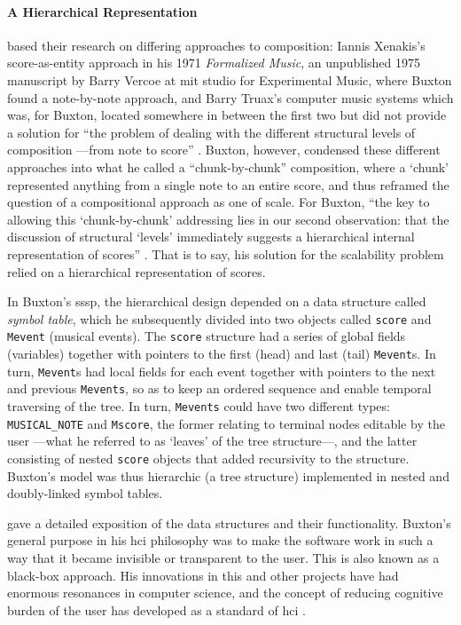 \paragraph{A Hierarchical Representation}
\textcite{DBLP:conf/icmc/BuxtonFBRSCM78} based their research on differing approaches to composition: Iannis Xenakis's score-as-entity approach in his 1971 \textit{Formalized Music}, an unpublished 1975 manuscript by Barry Vercoe at \gls{mit} studio for Experimental Music, where Buxton found a note-by-note approach, and Barry Truax's computer music systems \parencite{Tru73:The} which was, for Buxton, located somewhere in between the first two but did not provide a solution for ``the problem of dealing with the different structural levels of composition ---from note to score'' \parencite[120]{icmc/bbp2372.1978.012} . Buxton, however, condensed these different approaches into what he called a ``chunk-by-chunk'' composition, where a `chunk' represented anything from a single note to an entire score, and thus reframed the question of a compositional approach as one of scale. For Buxton, ``the key to allowing this `chunk-by-chunk' addressing lies in our second observation: that the discussion of structural `levels' immediately suggests a hierarchical internal representation of scores'' \parencite[120]{icmc/bbp2372.1978.012}. That is to say, his solution for the scalability problem relied on a hierarchical representation of scores. 

In Buxton's \gls{sssp}, the hierarchical design depended on a data structure called \textit{symbol table}, which he subsequently divided into two objects called \texttt{score} and \texttt{Mevent} (musical events). The \texttt{score} structure had a series of global fields (variables) together with pointers to the first (head) and last (tail) \texttt{Mevent}s. In turn, \texttt{Mevent}s had local fields for each event together with pointers to the next and previous \texttt{Mevents}, so as to keep an ordered sequence  and enable temporal traversing of the tree. In turn, \texttt{Mevents} could have two different types: \texttt{MUSICAL\_NOTE} and \texttt{Mscore}, the former relating to terminal nodes editable by the user ---what he referred to as `leaves' of the tree structure---, and the latter consisting of nested \texttt{score} objects that added recursivity to the structure. Buxton's model was thus hierarchic (a tree structure) implemented in nested and doubly-linked symbol tables.

\textcite{icmc/bbp2372.1978.012} gave a detailed exposition of the data structures and their functionality. Buxton's general purpose in his \gls{hci} philosophy was to make the software work in such a way that it became invisible or transparent to the user. This is also known as a black-box approach. His innovations in this and other projects have had enormous resonances in computer science, and the concept of reducing cognitive burden of the user has developed as a standard of \gls{hci} \parencite{youtube/buxton16}.

